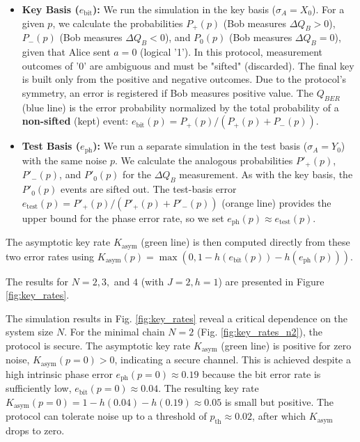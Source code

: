 \begin{itemize}
    \item \textbf{Key Basis ($e_{\text{bit}}$):} We run the simulation in the key basis ($\sigma_A=X_0$). For a given $p$, we calculate the probabilities $P_{+}(p)$ (Bob measures $\Delta Q_B > 0$), $P_{-}(p)$ (Bob measures $\Delta Q_B < 0$), and $P_{0}(p)$ (Bob measures $\Delta Q_B = 0$), given that Alice sent $a=0$ (logical '1'). In this protocol, measurement outcomes of '0' are ambiguous and must be "sifted" (discarded). The final key is built only from the positive and negative outcomes. Due to the protocol's symmetry, an error is registered if Bob measures positive value. The $Q_{BER}$ (blue line) is the error probability normalized by the total probability of a \textbf{non-sifted} (kept) event: $e_{\text{bit}}(p) = P_{+}(p) / (P_{+}(p) + P_{-}(p))$.
    \item \textbf{Test Basis ($e_{\text{ph}}$):} We run a separate simulation in the test basis ($\sigma_A=Y_0$) with the same noise $p$. We calculate the analogous probabilities $P'_{+}(p)$, $P'_{-}(p)$, and $P'_{0}(p)$ for the $\Delta Q_B$ measurement. As with the key basis, the $P'_{0}(p)$ events are sifted out. The test-basis error $e_{\text{test}}(p) = P'_{+}(p) / (P'_{+}(p) + P'_{-}(p))$ (orange line) provides the upper bound for the phase error rate, so we set $e_{\text{ph}}(p) \approx e_{\text{test}}(p)$.
\end{itemize}
The asymptotic key rate $K_{\text{asym}}$ (green line) is then computed directly from these two error rates using $K_{\text{asym}}(p) = \max(0, 1 - h(e_{\text{bit}}(p)) - h(e_{\text{ph}}(p)))$.

The results for $N=2, 3,$ and $4$ (with $J=2, h=1$) are presented in Figure \ref{fig:key_rates}.

The simulation results in Fig. \ref{fig:key_rates} reveal a critical dependence on the system size $N$.
For the minimal chain $N=2$ (Fig. \ref{fig:key_rates_n2}), the protocol is secure. The asymptotic key rate $K_{\text{asym}}$ (green line) is positive for zero noise, $K_{\text{asym}}(p=0) > 0$, indicating a secure channel. This is achieved despite a high intrinsic phase error $e_{\text{ph}}(p=0) \approx 0.19$ because the bit error rate is sufficiently low, $e_{\text{bit}}(p=0) \approx 0.04$. The resulting key rate $K_{\text{asym}}(p=0) = 1 - h(0.04) - h(0.19) \approx 0.05$ is small but positive. The protocol can tolerate noise up to a threshold of $p_{\text{th}} \approx 0.02$, after which $K_{\text{asym}}$ drops to zero.

